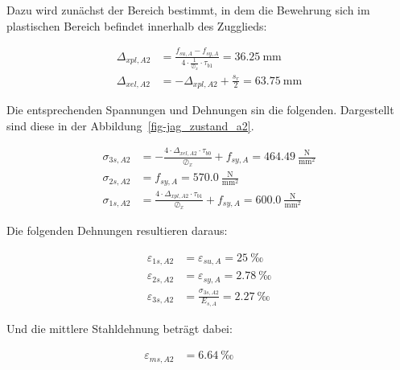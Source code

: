 \documentclass[
  11pt,
  letterpaper,
]{scrreprt}
\begin{document}
Dazu wird zunächst der Bereich bestimmt, in dem die Bewehrung sich im
plastischen Bereich befindet innerhalb des Zugglieds:

\[
\begin{aligned}
\Delta_{x pl , A2}& = \frac{f_{su , A} - f_{sy , A}}{4 \cdot \frac{1}{\oslash_{x}} \cdot \tau_{b1}} = 36.25 \ \mathrm{mm} \\ 
\Delta_{x el , A2}& = - \Delta_{x pl , A2} + \frac{s_{r}}{2} = 63.75 \ \mathrm{mm} \end{aligned}
\]

Die entsprechenden Spannungen und Dehnungen sin die folgenden.
Dargestellt sind diese in der Abbildung~\ref{fig-jag_zustand_a2}.

\[
\begin{aligned}
\sigma_{3 s , A2}& = - \frac{4 \cdot \Delta_{x el , A2} \cdot \tau_{b0}}{\oslash_{x}} + f_{sy , A} = 464.49 \ \frac{\mathrm{N}}{\mathrm{mm}^{2}} \\ 
\sigma_{2 s , A2}& = f_{sy , A} = 570.0 \ \frac{\mathrm{N}}{\mathrm{mm}^{2}} \\ 
\sigma_{1 s , A2}& = \frac{4 \cdot \Delta_{x pl , A2} \cdot \tau_{b1}}{\oslash_{x}} + f_{sy , A} = 600.0 \ \frac{\mathrm{N}}{\mathrm{mm}^{2}} \end{aligned}
\]

Die folgenden Dehnungen resultieren daraus:

\[
\begin{aligned}
\varepsilon_{1 s , A2}& = \varepsilon_{su , A} = 25 \ \mathrm{‰} \\ 
\varepsilon_{2 s , A2}& = \varepsilon_{sy , A} = 2.78 \ \mathrm{‰} \\ 
\varepsilon_{3 s , A2}& = \frac{\sigma_{3 s , A2}}{E_{s , A}} = 2.27 \ \mathrm{‰} \end{aligned}
\]

Und die mittlere Stahldehnung beträgt dabei:

\[
\begin{aligned}
\varepsilon_{m s , A2}& = 6.64 \ \mathrm{‰} \quad &  \quad &  
 \end{aligned}
\]
\end{document}
